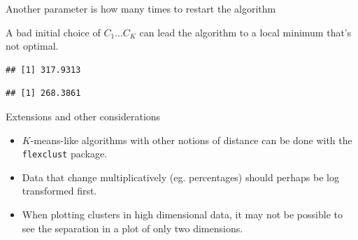 \documentclass[
  ignorenonframetext,
]{beamer}
\newenvironment{Shaded}{\begin{snugshade}}{\end{snugshade}}
\newcommand{\DataTypeTok}[1]{\textcolor[rgb]{0.13,0.29,0.53}{#1}}
\newcommand{\DecValTok}[1]{\textcolor[rgb]{0.00,0.00,0.81}{#1}}
\newcommand{\KeywordTok}[1]{\textcolor[rgb]{0.13,0.29,0.53}{\textbf{#1}}}
\newcommand{\NormalTok}[1]{#1}
\newcommand{\OperatorTok}[1]{\textcolor[rgb]{0.81,0.36,0.00}{\textbf{#1}}}
\providecommand{\tightlist}{%
  \setlength{\itemsep}{0pt}\setlength{\parskip}{0pt}}
\begin{document}
\begin{frame}[fragile]{Another parameter is how many times to restart
the algorithm}
\protect\hypertarget{another-parameter-is-how-many-times-to-restart-the-algorithm}{}

A bad initial choice of \(C_1 \ldots C_K\) can lead the algorithm to a
local minimum that's not optimal.

\begin{Shaded}
\end{Shaded}

\begin{verbatim}
## [1] 317.9313
\end{verbatim}

\begin{Shaded}
\end{Shaded}

\begin{verbatim}
## [1] 268.3861
\end{verbatim}

\end{frame}

\begin{frame}[fragile]{Extensions and other considerations}
\protect\hypertarget{extensions-and-other-considerations}{}

\begin{itemize}
\tightlist
\item
  \(K\)-means-like algorithms with other notions of distance can be done
  with the \texttt{flexclust} package.
\item
  Data that change multiplicatively (eg. percentages) should perhaps be
  log transformed first.
\item
  When plotting clusters in high dimensional data, it may not be
  possible to see the separation in a plot of only two dimensions.
\end{itemize}

\end{frame}
\end{document}
